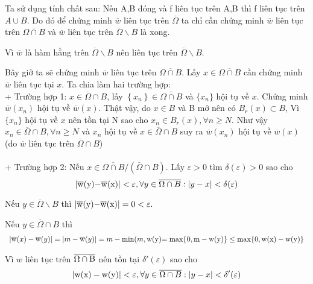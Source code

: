 Ta sử dụng tính chất sau: Nếu A,B đóng và f liên tục trên A,B thì f liên tục trên $A \cup B$. Do đó để chứng minh $\overline w$ liên tục trên $\overline \Omega$ ta chỉ cần chứng minh $\overline w$ liên tục trên $\overline {\Omega  \cap B} $ và $\overline w$ liên tục trên $\overline \Omega  \backslash B$ là xong.

Vì $\overline w$ là hàm hằng trên $\overline \Omega  \backslash B$ nên liên tục trên $\overline \Omega  \backslash B$.

Bây giở ta sẽ chứng minh $\overline w$ liên tục trên $\overline {\Omega  \cap B} $. Lấy $x\in \overline {\Omega  \cap B}$ cần chứng minh $\overline w$ liên tục tại $x.$ Ta chia làm hai trường hợp:
\\
+ Trường hợp 1: $x \in \overline \Omega   \cap B$, lấy $\left\{ {x_n } \right\} \in \overline {\Omega  \cap B}$ và $\{x_n\}$ hội tụ về $x$. Chứng minh $\overline w(x_n)$ hội tụ về $\overline w(x)$. Thật vậy, do $x\in B$ và B mở nên có $B_r(x)\subset B$, Vì $\{x_n\}$ hội tụ về $x$ nên tồn tại N sao cho $x_n\in B_r(x),\forall n\ge N$. Như vậy $x_n\in \overline \Omega\cap B,\forall n\ge N$ và $x_n$ hội tụ về $x\in  \overline \Omega   \cap B$ suy ra $\overline w(x_n)$ hội tụ về $\overline w(x)$ (do $\overline w$ liên tục trên $\overline \Omega \cap B$)\\\\
+ Trường hợp 2: Nếu $x \in \overline {\Omega  \cap B} /(\overline \Omega   \cap B)$. Lấy $\varepsilon  > 0$ tìm $\delta (\varepsilon ) > 0$ sao cho \[
\left| {\overline {\rm{w}} {\rm{(y) - }}\overline {\rm{w}} {\rm{(x)}}} \right| < \varepsilon ,\forall y \in \overline {\Omega  \cap B} :\left| {y - x} \right| < \delta (\varepsilon )
\]

Nếu $y \in \overline \Omega  \backslash B$ thì $\left| {\overline {\rm{w}} {\rm{(y) - }}\overline {\rm{w}} {\rm{(x)}}} \right|=0<\varepsilon.$ 

Nếu $y \in \overline \Omega   \cap B$ thì \[
\begin{array}{l}
 \left| {\overline {\rm{w}} (x) - \overline {\rm{w}} (y)} \right| = \left| {m - \overline {\rm{w}} (y)} \right| = m - \min (m,{\rm{w(y)}} 
 {\rm{ = max\{ 0,m - w(y)\} }} \le {\rm{max\{ 0,w(x) - w(y)\} }} \\ 
 \end{array}
\]

Vì $w$ liên tục trên $\overline {\Omega  \cap {\rm{B}}} $ nên tồn tại $\delta '(\varepsilon )$ sao cho \[
\left| {{\rm{w(x) - w(y)}}} \right| < \varepsilon ,\forall y \in \overline {\Omega  \cap B} :\left| {y - x} \right| < \delta '(\varepsilon )
\]


